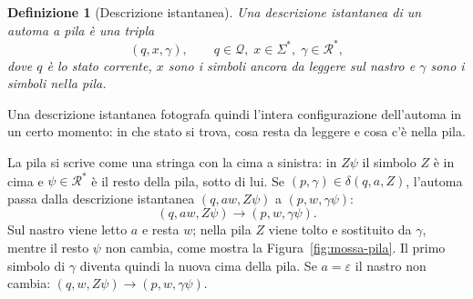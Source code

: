 \documentclass[a4paper, 11pt, oneside]{book}
\theoremstyle{formale}
\newtheorem*{definition}{Definizione}
\begin{document}
    \begin{definition}[Descrizione istantanea]
        Una \emph{descrizione istantanea} di un automa a pila \`e una tripla
        \begin{equation*}
            (q, x, \gamma),
            \qquad q \in \mathcal{Q},\; x \in \Sigma^*,\; \gamma \in \mathcal{R}^*,
        \end{equation*}
        dove $q$ \`e lo stato corrente, $x$ sono i simboli ancora da leggere sul nastro e
        $\gamma$ sono i simboli nella pila.
    \end{definition}
    Una descrizione istantanea fotografa quindi l'intera configurazione dell'automa in un
    certo momento: in che stato si trova, cosa resta da leggere e cosa c'\`e nella pila.

    La pila si scrive come una stringa con la cima a sinistra: in $Z\psi$ il simbolo
    $Z$ \`e in cima e $\psi \in \mathcal{R}^*$ \`e il resto della pila, sotto di
    lui. Se $(p, \gamma) \in \delta(q, a, Z)$, l'automa passa
    dalla descrizione istantanea $(q, aw, Z\psi)$ a
    $(p, w, \gamma\psi)$:
    \begin{equation*}
        (q, aw, Z\psi) \longrightarrow (p, w, \gamma\psi).
    \end{equation*}
    Sul nastro viene letto $a$ e resta $w$; nella pila $Z$ viene tolto e sostituito da
    $\gamma$, mentre il resto $\psi$ non cambia, come mostra la
    Figura~\ref{fig:mossa-pila}. Il primo simbolo di $\gamma$ diventa quindi la nuova
    cima della pila. Se $a = \varepsilon$ il nastro non cambia:
    $(q, w, Z\psi) \longrightarrow (p, w, \gamma\psi)$.
\end{document}
